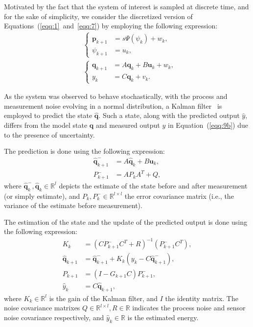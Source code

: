 \documentclass[letterpaper,10pt,conference]{ieeeconf}
\begin{document}
Motivated by the fact that the system of interest is sampled at discrete time, and for the sake of simplicity, we consider the discretized version of Equations~(\ref{eqq:1}~and~\ref{eqq:7}) by employing the following expression:
\begin{subequations}\begin{align}
  &\begin{cases}
  \mathbf{p}_{k+1}&=s\Psi(\psi_k)+w_k,\\
  \psi_{k+1}&=u_k,
  \end{cases}\tag{9b}\label{eqq:9b}\\
  &\begin{cases}
  \mathbf{q}_{k+1}&=A\mathbf{q}_{k}+B\mathbf{u}_{k}+w_k,\\
  y_k&=C\mathbf{q}_k+v_k.
  \end{cases}
\end{align}\end{subequations}

As the system was observed to behave stochastically, with the process and measurement noise evolving in a normal distribution, a Kalman filter~\cite{stengel1994optimal, simon2006optimal} is employed to predict the state $\hat{\mathbf{q}}$. Such a state, along with the predicted output $\hat{y}$, differs from the model state $\mathbf{q}$ and measured output $y$ in Equation~(\ref{eqq:9b}) due to the presence of uncertainty.

The prediction is done using the following expression:
\begin{subequations}\label{eqq:10}\begin{align}
  \hat{\mathbf{q}}_{k+1}^-&=A\hat{\mathbf{q}}_{k}+B\mathbf{u}_k,\label{eqq:10a}\\
  P_{k+1}^-&=AP_kA^T+Q,\label{eqq:10b}
\end{align}\end{subequations}
where $\hat{\mathbf{q}}_k^-,\hat{\mathbf{q}}_k\in\mathbb{R}^l$ depicts the estimate of the state before and after measurement (or simply estimate), and $P_k,P_k^-\in\mathbb{R}^{l\times l}$ the error covariance matrix (i.e., the variance of the estimate before measurement). 

The estimation of the state and the update of the predicted output is done using the following expression:
\begin{subequations}\label{eqq:11}\begin{align}
  K_k&=(CP_{k+1}^-C^T+R)^{-1}(P_{k+1}^-C^T),\\
  \hat{\mathbf{q}}_{k+1}&=\hat{\mathbf{q}}_{k+1}^-+K_k(y_k-C\hat{\mathbf{q}}_{k+1}^-),\label{eqq:11b}\\
  P_{k+1}&=(I-G_{k+1}C)P_{k+1}^-,\\
  \hat{y}_k&=C\hat{\mathbf{q}}_{k+1},\label{eqq:11d}
\end{align}
\end{subequations}
where $K_k\in\mathbb{R}^l$ is the gain of the Kalman filter, and $I$ the identity matrix. The noise covariance matrixes $Q\in\mathbb{R}^{l\times l},R\in\mathbb{R}$ indicates the process noise and sensor noise covariance respectively, and $\hat{y}_k\in\mathbb{R}$ is the estimated energy.
\end{document}

